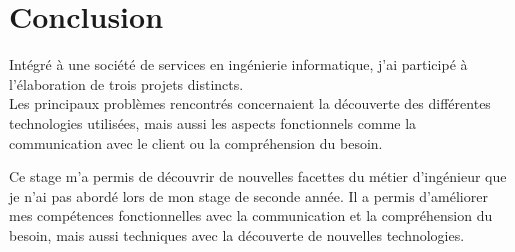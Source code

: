 \cleardoublepage

\chapter*{Conclusion}




Intégré à une société de services en ingénierie informatique, j'ai participé à l'élaboration de trois projets distincts.
\\



Les principaux problèmes rencontrés concernaient la découverte des différentes technologies utilisées, mais aussi les aspects fonctionnels comme la communication avec le client ou la compréhension du besoin.

Ce stage m'a permis de découvrir de nouvelles facettes du métier d'ingénieur que je n'ai pas abordé lors de mon stage de seconde année.
Il a permis d'améliorer mes compétences fonctionnelles avec la communication et la compréhension du besoin, mais aussi techniques avec la découverte de nouvelles technologies.